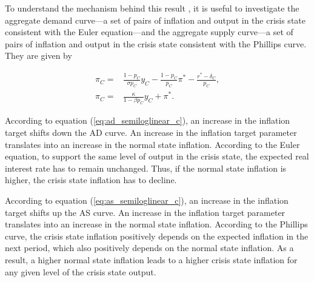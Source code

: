 \documentclass[11pt]{article}
\begin{document}
\begin{singlespace}
		To understand the mechanism behind this result , it is useful to investigate the aggregate demand curve---a set of pairs of inflation and output in the crisis state consistent with the  Euler equation---and the aggregate supply curve---a set of pairs of inflation and output in the crisis state consistent with the Phillips curve. They are given by

		\begin{align}
			\pi_C =& \frac{1-p_C}{\sigma p_C}y_C - \frac{1-p_C}{p_C}\pi^* - \frac{r^* - \delta_C}{p_C},\label{eq:ad_semiloglinear_c}\\
			\pi_C =& \frac{\kappa }{1-\beta p_C}y_C+\pi^*.\label{eq:as_semiloglinear_c}
		\end{align}

		 According to equation (\ref{eq:ad_semiloglinear_c}), an increase in the inflation target shifts down the AD curve. An increase in the inflation target parameter translates into an increase in the normal state inflation. According to the Euler equation, to support the same level of output in the crisis state, the expected real interest rate has to remain unchanged. Thus, if the normal state inflation is higher, the crisis state inflation has to decline.

		According to equation (\ref{eq:as_semiloglinear_c}), an increase in the inflation target shifts up the AS curve. An increase in the inflation target parameter translates into an increase in the normal state inflation. According to the Phillips curve, the crisis state inflation positively depends on the expected inflation in the next period, which also positively depends on the normal state inflation. As a result, a higher normal state inflation leads to a higher crisis state inflation for any given level of the crisis state output.



\end{singlespace}
\end{document}
